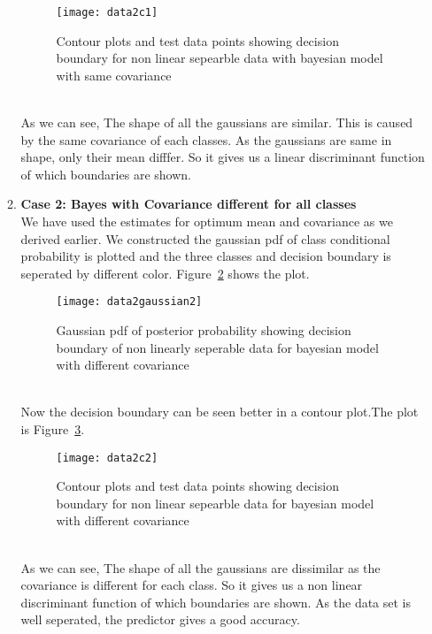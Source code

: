 \documentclass[11pt,paper=a4,answers]{exam}
\begin{document}
\begin{questions}
\begin{enumerate}[i.]
\begin{enumerate}
\begin{figure}[ht]
                \centering
                \texttt{[image: data2c1]}
                \vspace{-30pt}
                \caption{Contour plots and test data points showing decision boundary for non linear sepearble data with bayesian model with same covariance}
                \label{fig:data2c1}
            \end{figure}\\
            As we can see, The shape of all the gaussians are similar. This is caused by the same covariance of each classes. As the gaussians are same in shape, only their mean difffer. So it gives us a linear discriminant function of which boundaries are shown.\\
                        
            \item \textbf{Case 2: Bayes with Covariance different for all classes}\\
            We have used the estimates for optimum mean and covariance as we derived earlier. We constructed the gaussian pdf of class conditional probability is plotted and the three classes and decision boundary is seperated by different color. Figure~\ref{fig:data2g2} shows the plot.\\
            \begin{figure}[ht]
                \centering
                \texttt{[image: data2gaussian2]}
                \vspace{-30pt}
                \caption{Gaussian pdf of posterior probability showing decision boundary of non linearly seperable data for bayesian model with different covariance}
                \label{fig:data2g2}
            \end{figure}\\
            Now the decision boundary can be seen better in a contour plot.The plot is Figure~\ref{fig:data2c2}.\\ 
            \begin{figure}[ht]
                \centering
                \texttt{[image: data2c2]}
                \vspace{-30pt}
                \caption{Contour plots and test data points showing decision boundary for non linear sepearble data for bayesian model with different covariance}
                \label{fig:data2c2}
            \end{figure}\\
            As we can see, The shape of all the gaussians are dissimilar as the covariance is different for each class. So it gives us a non linear discriminant function of which boundaries are shown. As the data set is well seperated, the predictor gives a good accuracy.


\end{enumerate}
\end{enumerate}
\end{questions}
\end{document}
